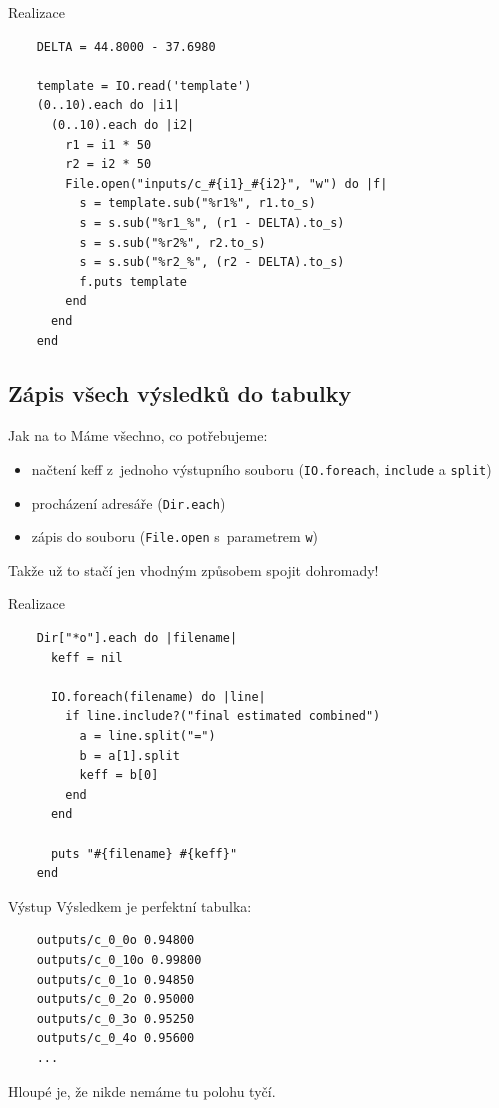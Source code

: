 \documentclass{beamer}
\begin{document}
\begin{frame}[fragile]{Realizace}
  \scriptsize
  \begin{verbatim}
    DELTA = 44.8000 - 37.6980

    template = IO.read('template')
    (0..10).each do |i1|
      (0..10).each do |i2|
        r1 = i1 * 50
        r2 = i2 * 50
        File.open("inputs/c_#{i1}_#{i2}", "w") do |f|
          s = template.sub("%r1%", r1.to_s)
          s = s.sub("%r1_%", (r1 - DELTA).to_s)
          s = s.sub("%r2%", r2.to_s)
          s = s.sub("%r2_%", (r2 - DELTA).to_s)
          f.puts template
        end
      end
    end
  \end{verbatim}
\end{frame}

\subsection{Zápis všech výsledků do tabulky}

\begin{frame}{Jak na to}
  Máme všechno, co potřebujeme:
  \begin{itemize}
    \item načtení keff z~jednoho výstupního souboru (\texttt{IO.foreach}, \texttt{include} a \texttt{split})
    \item procházení adresáře (\texttt{Dir.each})
    \item zápis do souboru (\texttt{File.open} s~parametrem \texttt{w})
  \end{itemize}
  Takže už to stačí jen vhodným způsobem spojit dohromady!
\end{frame}

\begin{frame}[fragile]{Realizace}
  \scriptsize
  \begin{verbatim}
    Dir["*o"].each do |filename|
      keff = nil

      IO.foreach(filename) do |line|
        if line.include?("final estimated combined")
          a = line.split("=")
          b = a[1].split
          keff = b[0]
        end
      end

      puts "#{filename} #{keff}"
    end
  \end{verbatim}
\end{frame}

\begin{frame}[fragile]{Výstup}
  Výsledkem je perfektní tabulka:
  {\scriptsize
  \begin{verbatim}
    outputs/c_0_0o 0.94800
    outputs/c_0_10o 0.99800
    outputs/c_0_1o 0.94850
    outputs/c_0_2o 0.95000
    outputs/c_0_3o 0.95250
    outputs/c_0_4o 0.95600
    ...
  \end{verbatim}}
  Hloupé je, že nikde nemáme tu polohu tyčí.
\end{frame}
\end{document}
